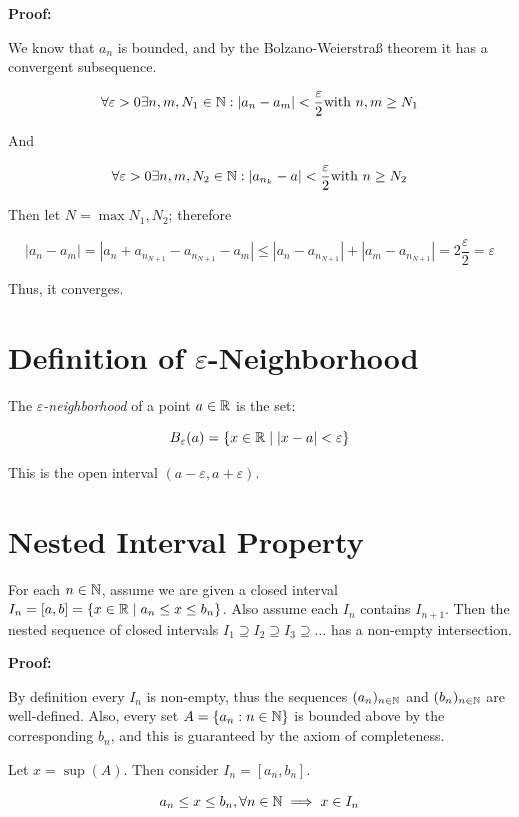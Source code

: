 \textbf{Proof:}

We know that \(a_n\) is bounded, and by the Bolzano-Weierstraß theorem it has a convergent subsequence.

\[
	\forall \varepsilon > 0 \exists n,m,N_1 \in \mathbb{N}: |a_n - a_m| < \frac{\varepsilon}{2} \text{with } n, m \ge N_1
\]

And

\[
	\forall \varepsilon > 0 \exists n,m,N_2 \in \mathbb{N}: |a_{n_k} - a| < \frac{\varepsilon}{2} \text{with } n \ge N_2
\]


Then let \(N = \max{N_1, N_2}\); therefore

\[
	|a_n - a_m| = |a_n + a_{n_{N + 1}} - a_{n_{N + 1}} - a_m| \le |a_n - a_{n_{N + 1}} | + |a_m - a_{n_{N + 1}} | = 2\frac{\varepsilon}{2} = \varepsilon
\]

Thus, it converges.

\QED

\section{Definition of \texorpdfstring{\(\varepsilon\)}{ε}-Neighborhood}

The \emph{\(\varepsilon\)-neighborhood} of a point \(a \in \mathbb{R}\) is the set:

\[
	B_\varepsilon(a) = \{x \in \mathbb{R} \mid |x - a| < \varepsilon\}
\]

This is the open interval \((a - \varepsilon, a + \varepsilon)\).

\section{Nested Interval Property}

For each \(n \in \mathbb{N}\), assume we are given a closed interval  \(I_n = [a, b] = \{x \in \mathbb{R} \mid a_n \le x \le b_n\}\).
Also assume each \(I_n\) contains \(I_{n + 1}\). Then the nested sequence of closed intervals \(I_1 \supseteq I_2 \supseteq I_3 \supseteq \ldots\)
has a non-empty intersection.

\textbf{Proof:}

By definition every \(I_n\) is non-empty, thus the sequences \((a_n)_{n \in \mathbb{N}}\) and \((b_n)_{n \in \mathbb{N}}\) are well-defined.
Also, every set \(A = \{a_n: n \in \mathbb{N}\}\) is bounded above by the corresponding \(b_n\), and this is guaranteed by
the axiom of completeness.

Let \(x = \sup(A)\). Then consider \(I_n = [a_n, b_n]\).

\[
	a_n \le x \le b_n, \forall n \in \mathbb{N} \implies x \in I_n
\]

